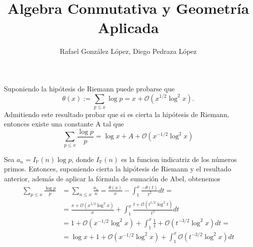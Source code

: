 \documentclass[twoside]{article}
\begin{document}
\title{Algebra Conmutativa y Geometría Aplicada}
\author{Rafael González López, Diego Pedraza López}
\maketitle

\begin{ejercicio}{12}
Suponiendo la hipótesis de Riemann puede probarse que
$$
\theta(x):=\sum_{p\leq x}\log p = x + \mathcal{O}(x^{1/2}\log^2x).
$$
Admitiendo este resultado probar que si es cierta la hipótesis de Riemann, entonces existe una constante A tal que
$$
\sum_{p\leq x}\frac{\log p}{p} = \log x + A + \mathcal{O}(x^{-1/2}\log^2 x)
$$
\begin{sol}
\end{sol}
\end{ejercicio}
Sea $a_n = I_{\mathbb{P}}(n)\log p$, donde $I_{\mathbb{P}}(n)$ es la funcion indicatriz de los números primos. Entonces, suponiendo cierta la hipótesis de Riemann y el resultado anterior, además de aplicar la fórmula de sumación de Abel, obtenemos
\begin{align*}
\sum_{p\leq x}\frac{\log p}{p} &= \sum_{n\leq x}\frac{a_n}{n} = \frac{\theta(x)}{x} - \int_1^x \frac{-\theta(t)}{t^2}dt =\\
&= \frac{x + \mathcal{O}(x^{1/2}\log^2x)}{x} + \int_1^x \frac{t + \mathcal{O}(t^{1/2}\log^2t)}{t^2}dt\\
 &= 1+\mathcal{O}(x^{-1/2}\log^2 x) + \int_1^x \frac{1}{t} + \mathcal{O}(t^{-3/2}\log^2 x)dt =\\
&=\log x + 1 + \mathcal{O}(x^{-1/2}\log^2 x)  + \int_1^x \mathcal{O}(t^{-3/2}\log^2 x)dt
\end{align*}
\end{document}

